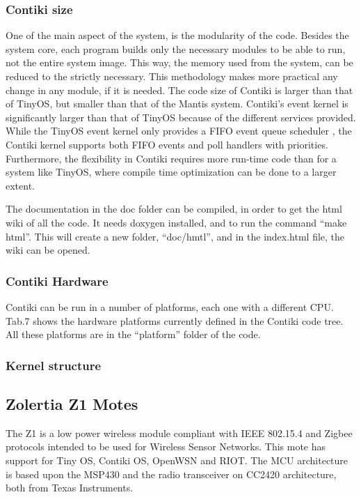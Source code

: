 \subsubsection{Contiki size}
One of the main aspect of the system,
	is the modularity of the code.
Besides the system core,
	each program builds only the necessary modules to be able to run,
	not the entire system image.
This way,
	the memory used from the system,
	can be reduced to the strictly necessary.
This methodology makes more practical any change in any module,
	if it is needed.
The code size of Contiki is larger than that of TinyOS,
	but smaller than that of the Mantis system.
Contiki's event kernel is significantly larger than that of TinyOS because of the different services provided.
While the TinyOS event kernel only provides a FIFO event queue scheduler ,
	the Contiki kernel supports both FIFO events and poll handlers with priorities.
Furthermore,
	the flexibility in Contiki requires more run-time code than for a system like TinyOS,
	where compile time optimization can be done to a larger extent.


The documentation in the doc folder can be compiled,
	in order to get the html wiki of all the code.
It needs doxygen installed,
	and to run the command “make html”.
This will create a new folder,
	“doc/hmtl”,
	and in the index.html file,
	the wiki can be opened.


\subsubsection{Contiki Hardware}
Contiki can be run in a number of platforms,
	each one with a different CPU.
Tab.7 shows the hardware platforms currently defined in the Contiki code tree.
All these platforms are in the “platform” folder of the code.

\subsubsection{Kernel structure}





\subsection{Zolertia Z1 Motes}
The Z1 is a low power wireless module compliant with IEEE 802.15.4 and Zigbee protocols intended to be used for Wireless Sensor Networks.
This mote has support for Tiny OS,
	Contiki OS,
	OpenWSN and RIOT.
The MCU architecture is based upon the MSP430 and the radio transceiver on CC2420 architecture,
	both from Texas Instruments.

